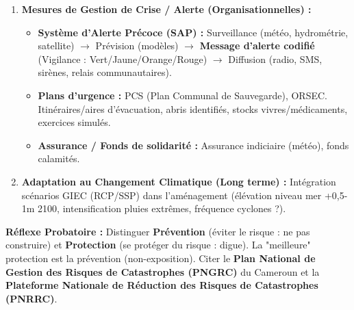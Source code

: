 \documentclass[11pt]{article}
\begin{document}
\begin{methode}
\begin{enumerate}
              \begin{itemize}
                  \item \textbf{Ouvrages :} Digues, barrages de rétention (ex: Lagdo, Memve'ele - gestion des lâchers), murs de soutènement, brise-lames, seuils de ralentissement.
                  \item \textbf{Bâtiment :} Normes parasismiques / paracycloniques (toitures ancrées, ouvertures protégées), surélévation habitations (pilotis), points d'eau/sanitation hors d'eau.
              \end{itemize}
        \item \textbf{Mesures de Gestion de Crise / Alerte (Organisationnelles) :}
              \begin{itemize}
                  \item \textbf{Système d'Alerte Précoce (SAP) :} Surveillance (météo, hydrométrie, satellite) $\rightarrow$ Prévision (modèles) $\rightarrow$ \textbf{Message d'alerte codifié} (Vigilance : Vert/Jaune/Orange/Rouge) $\rightarrow$ Diffusion (radio, SMS, sirènes, relais communautaires).
                  \item \textbf{Plans d'urgence :} PCS (Plan Communal de Sauvegarde), ORSEC. Itinéraires/aires d'évacuation, abris identifiés, stocks vivres/médicaments, exercices simulés.
                  \item \textbf{Assurance / Fonds de solidarité :} Assurance indiciaire (météo), fonds calamités.
              \end{itemize}
        \item \textbf{Adaptation au Changement Climatique (Long terme) :} Intégration scénarios GIEC (RCP/SSP) dans l'aménagement (élévation niveau mer +0,5-1m 2100, intensification pluies extrêmes, fréquence cyclones ?).
    \end{enumerate}
    \textbf{Réflexe Probatoire :} Distinguer \textbf{Prévention} (éviter le risque : ne pas construire) et \textbf{Protection} (se protéger du risque : digue). La "meilleure" protection est la prévention (non-exposition). Citer le \textbf{Plan National de Gestion des Risques de Catastrophes (PNGRC)} du Cameroun et la \textbf{Plateforme Nationale de Réduction des Risques de Catastrophes (PNRRC)}.
\end{methode}
\end{document}
